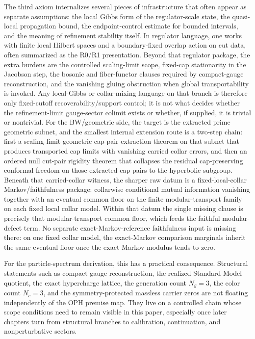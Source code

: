 \documentclass[11pt]{article}
\begin{document}
The third axiom internalizes several pieces of infrastructure that often appear as separate
assumptions: the local Gibbs form of the regulator-scale state, the
quasi-local propagation bound, the endpoint-control estimate for bounded intervals, and the
meaning of refinement stability itself. In regulator language, one works with finite local
Hilbert spaces and a boundary-fixed overlap action on cut data, often summarized as the R0/R1
presentation. Beyond that regulator package, the extra burdens are the controlled scaling-limit
scope, fixed-cap stationarity in the Jacobson step, the bosonic and fiber-functor clauses
required by compact-gauge reconstruction, and the vanishing gluing obstruction when global
transportability is invoked. Any local-Gibbs or collar-mixing language on that branch is therefore
only fixed-cutoff recoverability/support control; it is not what decides whether the
refinement-limit gauge-sector colimit exists or whether, if supplied, it is trivial or
nontrivial.
For the BW/geometric side, the target is the extracted prime geometric subnet, and the
smallest internal extension route is a two-step chain: first a scaling-limit geometric cap-pair extraction
theorem on that subnet that produces transported cap limits with vanishing carried collar errors,
and then an ordered null cut-pair rigidity theorem that
collapses the residual cap-preserving conformal freedom on those extracted cap pairs to the
hyperbolic subgroup. Beneath that carried-collar witness, the sharper raw datum is a fixed-local-collar
Markov/faithfulness package: collarwise conditional mutual information vanishing together with an
eventual common floor on the finite modular-transport family on each fixed local collar model. Within that datum the
single missing clause is precisely that modular-transport common floor, which feeds
the faithful modular-defect term. No separate exact-Markov-reference faithfulness input is
missing there: on one fixed collar model, the exact-Markov comparison marginals inherit the same
eventual floor once the exact-Markov modulus tends to zero.

For the particle-spectrum derivation, this has a practical consequence. Structural statements such
as compact-gauge reconstruction, the realized Standard Model quotient, the exact hypercharge
lattice, the generation count \(N_g=3\), the color count \(N_c=3\), and the symmetry-protected
massless carrier zeros are not floating independently of the OPH premise map. They live on a
controlled chain whose scope conditions need to remain visible in this paper,
especially once later chapters turn from structural branches to calibration, continuation, and
nonperturbative sectors.
\end{document}
